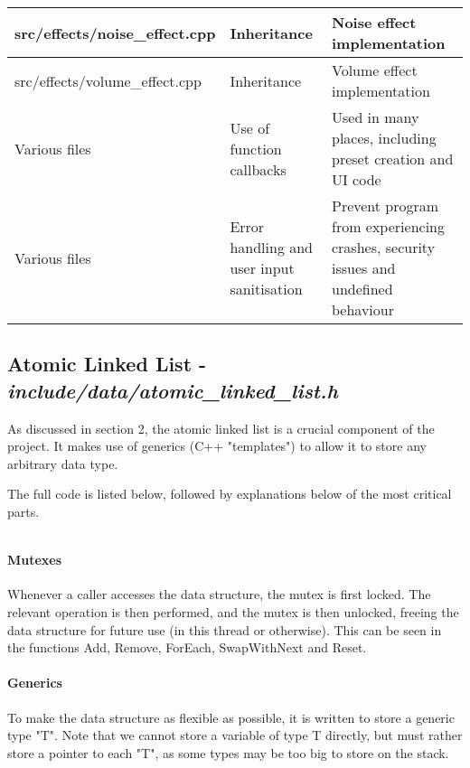 {\begin{table}[h!]
\begin{center}
\begin{tabularx}{1.0 \textwidth} {
					| >{\raggedright\arraybackslash}X 
					| >{\raggedright\arraybackslash}X
					| >{\raggedright\arraybackslash}X 
					|
				}
				\hline
				src/effects/noise\_effect.cpp & Inheritance & Noise effect implementation \\
				
				\hline
				src/effects/volume\_effect.cpp & Inheritance & Volume effect implementation \\
				
				\hline
				Various files & Use of function callbacks & Used in many places, including preset creation and UI code \\
				
				\hline
				Various files & Error handling and user input sanitisation & Prevent program from experiencing crashes, security issues and undefined behaviour \\
				
				\hline
			\end{tabularx}
		\end{center}
	\end{table}
}

\pagebreak
\subsection{Atomic Linked List - \textit{include/data/atomic\_linked\_list.h}}
As discussed in section 2, the atomic linked list is a crucial component of the project.  It makes use of generics (C++ "templates") to allow it to store any arbitrary data type. 

The full code is listed below, followed by explanations below of the most critical parts.

\inputminted[linenos]{c++}{../include/data/atomic_linked_list.h}

\paragraph{Mutexes} Whenever a caller accesses the data structure, the mutex is first locked. The relevant operation is then performed, and the mutex is then unlocked, freeing the data structure for future use (in this thread or otherwise). This can be seen in the functions Add, Remove, ForEach, SwapWithNext and Reset.

\paragraph{Generics} To make the data structure as flexible as possible, it is written to store a generic type "T". Note that we cannot store a variable of type T directly, but must rather store a pointer to each "T", as some types may be too big to store on the stack.

